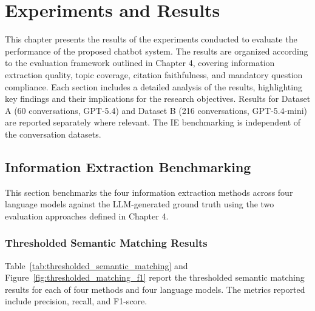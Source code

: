 \chapter{Experiments and Results}

This chapter presents the results of the experiments conducted to evaluate the performance of the proposed chatbot system. The results are organized according to the evaluation framework outlined in Chapter 4, covering information extraction quality, topic coverage, citation faithfulness, and mandatory question compliance. 
Each section includes a detailed analysis of the results, highlighting key findings and their implications for the research objectives. 
Results for Dataset A (60 conversations, GPT-5.4) and Dataset B (216 conversations, GPT-5.4-mini) are reported separately where relevant. 
The IE benchmarking is independent of the conversation datasets.

\section{Information Extraction Benchmarking}

This section benchmarks the four information extraction methods across four language models against the LLM-generated ground truth using the two evaluation approaches defined in Chapter 4.

\subsection{Thresholded Semantic Matching Results}

Table~\ref{tab:thresholded_semantic_matching} and Figure~\ref{fig:thresholded_matching_f1} report the thresholded semantic matching results for each of four methods and four language models. 
The metrics reported include precision, recall, and F1-score.

